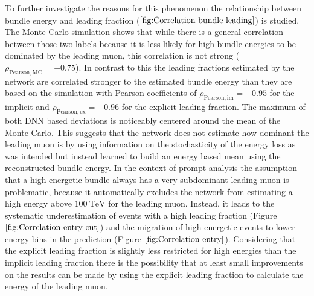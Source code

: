 \documentclass[
  tucolor,       %
  BCOR=12mm,     %
  parskip=half,  %
  open=any,      %
  cleardoublepage=plain,  %
]{tudothesis}
\begin{document}
To further investigate the reasons for this phenomenon the relationship between bundle energy and leading fraction ($\ref{fig:Correlation bundle leading}$) is studied.
The Monte-Carlo simulation shows that while there is a general correlation between those two labels because it is less likely for high bundle energies to be dominated by the leading muon, this correlation is not strong ($\rho_{\mathrm{Pearson,MC}}=-0.75$).
In contrast to this the leading fractions estimated by the network are correlated stronger to the estimated bundle energy than they are based on the simulation with Pearson coefficients of $\rho_{\mathrm{Pearson,im}}=-0.95$ for the implicit and $\rho_{\mathrm{Pearson,ex}}=-0.96$ for the explicit leading fraction.
The maximum of both DNN based deviations is noticeably centered around the mean of the Monte-Carlo.
This suggests that the network does not estimate how dominant the leading muon is by using information on the stochasticity of the energy loss as was intended but instead learned to build an energy based mean using the reconstructed bundle energy.
In the context of prompt analysis the assumption that a high energetic bundle always has a very subdominant leading muon is problematic, because it automatically excludes the network from estimating a high energy above $\SI{100}{\tera\electronvolt}$ for the leading muon. Instead, it leads to the systematic underestimation of events with a high leading fraction (Figure $\ref{fig:Correlation entry cut}$) and the migration of high energetic events to lower energy bins in the prediction (Figure $\ref{fig:Correlation entry}$).
Considering that the explicit leading fraction is slightly less restricted for high energies than the implicit leading fraction there is the possibility that at least small improvements on the results can be made by using the explicit leading fraction to calculate the energy of the leading muon.
\end{document}
